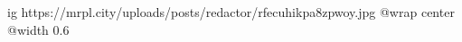  
 
 
 
 

\ifcmt
  ig https://mrpl.city/uploads/posts/redactor/rfecuhikpa8zpwoy.jpg
  @wrap center
  @width 0.6
\fi
